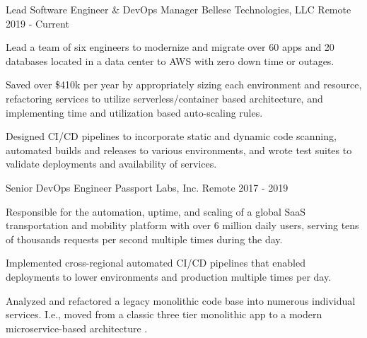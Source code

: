 
\begin{cventries}

  \cventry
    {Lead Software Engineer \& DevOps Manager} %
    {Bellese Technologies, LLC} %
    {Remote} %
    {2019 - Current} %
    {
      \begin{cvitems} %
        \item {Lead a team of six engineers to modernize and migrate over 60 apps and 20 databases located in a data center to AWS with zero down time or outages.} 
        \item {Saved over \$410k per year by appropriately sizing each environment and resource, refactoring services to utilize serverless/container based architecture, and implementing time and utilization based auto-scaling rules.}
  \item {Designed CI/CD pipelines to incorporate static and dynamic code scanning, automated builds and releases to various environments, and wrote test suites to validate deployments and availability of services.}
      \end{cvitems}
    }

  \cventry
    {Senior DevOps Engineer} %
    {Passport Labs, Inc.} %
    {Remote} %
    {2017 - 2019} %
    {
      \begin{cvitems} %
        \item {Responsible for the automation, uptime, and scaling of a  global SaaS transportation and mobility platform with over 6 million daily users, serving tens of thousands requests per second multiple times during the day.}
  \item {Implemented cross-regional automated CI/CD pipelines that enabled deployments to lower environments and production multiple times per day.}
  \item {Analyzed and refactored a legacy monolithic code base into numerous individual services. I.e., moved from a classic three tier monolithic app to a modern microservice-based architecture .}
      \end{cvitems}
    }


\end{cventries}
